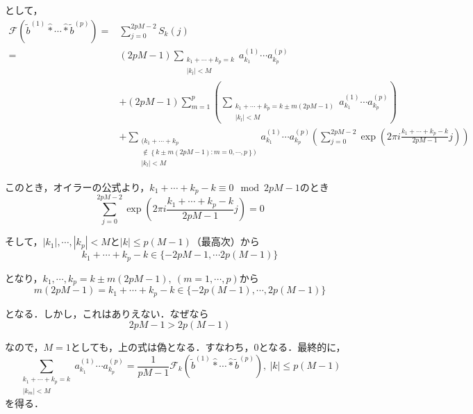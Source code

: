 \documentclass[11pt,a4paper,titlepage]{jsreport}
\theoremstyle{definition}
\begin{document}
\begin{description}
    として，
    \begin{align*}
      \mathcal{F}\left(\tilde{b}^{(1)} \hat* \cdots \hat* \tilde{b}^{(p)}\right) = & \sum_{j=0}^{2pM-2} S_k(j)                                                     \\
      =                                                                            & (2pM-1) \sum_{\substack{{k_1+\cdots+k_p=k}                                    \\ {|k_l|<M}}} a_{k_1}^{(1)}\cdots a_{k_p}^{(p)} \\
                                                                                   & + (2pM-1) \sum_{m=1}^{p} \left( \sum_{\substack{k_1+\cdots+k_p=k \pm m(2pM-1) \\ |k_l|<M}} a_{k_1}^{(1)} \cdots a_{k_p}^{(p)} \right)  \\
                                                                                   & +  \sum_{\substack{( k_1+\cdots+k_p                                           \\ \notin \left\{ k \pm m(2pM-1) :m=0,\cdots,p\right\} ) \\ |k_l|<M}} a_{k_1}^{(1)} \cdots a_{k_p}^{(p)} \left( \sum_{j=0}^{2pM-2} \exp \left( 2\pi i \frac{k_1+\cdots+k_p-k}{2pM-1}j \right)\right)
    \end{align*}

    このとき，オイラーの公式より，$k_1+\cdots+k_p-k \equiv 0 \mod 2pM-1$のとき
    \begin{equation*}
      \sum_{j=0}^{2pM-2} \exp(2\pi i \frac{k_1+\cdots+k_p-k}{2pM-1}j) = 0
    \end{equation*}

    そして，$|k_1|,\cdots,|k_p|<M$と$|k|\leq p(M-1)$（最高次）から
    \begin{equation*}
      k_1+\cdots+k_p-k \in \{ -2pM-1, \cdots 2p(M-1) \}
    \end{equation*}

    となり，$k_1,\cdots,k_p = k \pm m(2pM-1),\ (m=1,\cdots, p)$から
    \begin{equation*}
      m(2pM-1) = k_1 + \cdots + k_p - k \in \{ -2p(M-1),\cdots, 2p(M-1)\}
    \end{equation*}

    となる．しかし，これはありえない．なぜなら
    \begin{equation*}
      2pM-1 > 2p(M-1)
    \end{equation*}

    なので，$M=1$としても，上の式は偽となる．すなわち，$0$となる．最終的に，
    \begin{equation*}
      \sum_{\substack{k_1+\cdots+k_p=k \\ |k_m|<M}} a_{k_1}^{(1)}\cdots a_{k_p}^{(p)} = \frac{1}{pM-1}\mathcal{F}_k(\tilde{b}^{(1)} \hat* \cdots \hat* \tilde{b}^{(p)}),\ |k|\leq p(M-1)
    \end{equation*}
    を得る．
\end{description}
\end{document}
